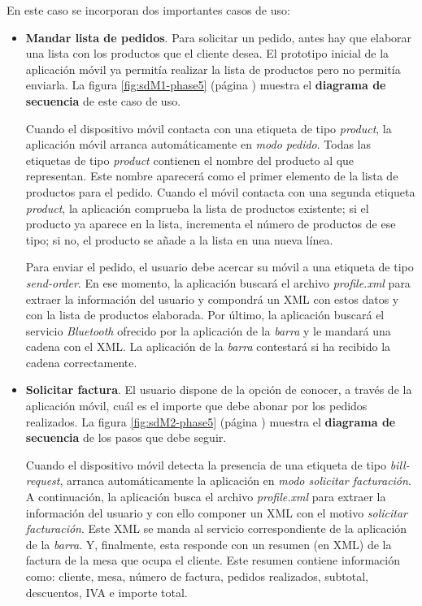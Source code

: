 En este caso se incorporan dos importantes casos de uso:
\begin{itemize}
\item \textbf{Mandar lista de pedidos}. Para solicitar un pedido, antes hay
que elaborar una lista con los productos que el cliente desea. El prototipo
inicial de la aplicación móvil ya permitía realizar la lista de productos
pero no permitía enviarla. La figura \ref{fig:sdM1-phase5} (página
\pageref{fig:sdM1-phase5}) muestra el \textbf{diagrama de secuencia} de este
caso de uso.

Cuando el dispositivo móvil contacta con una etiqueta de tipo \emph{product},
la aplicación móvil arranca automáticamente en \emph{modo pedido}. Todas las
etiquetas de tipo \emph{product} contienen el nombre del producto al que
representan. Este nombre aparecerá como el primer elemento de la lista de
productos para el pedido. Cuando el móvil contacta con una segunda etiqueta
\emph{product}, la aplicación comprueba la lista de productos existente; si
el producto ya aparece en la lista, incrementa el número de productos de ese
tipo; si no, el producto se añade a la lista en una nueva línea.

Para enviar el pedido, el usuario debe acercar su móvil a una etiqueta de
tipo \emph{send-order}. En ese momento, la aplicación buscará el archivo
\emph{profile.xml} para extraer la información del usuario y compondrá un
\acs{XML} con estos datos y con la lista de productos elaborada. Por último,
la aplicación buscará el servicio \emph{Bluetooth} ofrecido por la aplicación
de la \emph{barra} y le mandará una cadena con el \acs{XML}. La aplicación
de la \emph{barra} contestará si ha recibido la cadena correctamente.

\item \textbf{Solicitar factura}. El usuario dispone de la opción de conocer,
a través de la aplicación móvil, cuál es el importe que debe abonar por los
pedidos realizados. La figura \ref{fig:sdM2-phase5} (página
\pageref{fig:sdM2-phase5}) muestra el \textbf{diagrama de secuencia} de los
pasos que debe seguir.

Cuando el dispositivo móvil detecta la presencia de una etiqueta de tipo
\emph{bill-request}, arranca automáticamente la aplicación en \emph{modo
solicitar facturación}. A continuación, la aplicación busca el archivo
\emph{profile.xml} para extraer la información del usuario y con ello componer
un \acs{XML} con el motivo \emph{solicitar facturación}. Este \acs{XML} se
manda al servicio correspondiente de la aplicación de la \emph{barra}. Y,
finalmente, esta responde con un resumen (en \acs{XML}) de la factura de la 
mesa que ocupa el cliente. Este resumen contiene información como: cliente, 
mesa, número de factura, pedidos realizados, subtotal, descuentos, IVA e
importe total.
\end{itemize}


